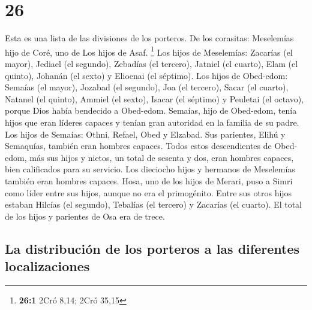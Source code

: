 \hypertarget{section-25}{%
\section{26}\label{section-25}}

 Esta es una lista de las divisiones de los porteros. De
los corasitas: Meselemías hijo de Coré, uno de Los hijos de Asaf.
\footnote{\textbf{26:1} 2Cró 8,14; 2Cró 35,15}  Los hijos
de Meselemías: Zacarías (el mayor), Jediael (el segundo), Zebadías (el
tercero), Jatniel (el cuarto),  Elam (el quinto), Johanán
(el sexto) y Elioenai (el séptimo).  Los hijos de
Obed-edom: Semaías (el mayor), Jozabad (el segundo), Joa (el tercero),
Sacar (el cuarto), Natanel (el quinto),  Ammiel (el
sexto), Isacar (el séptimo) y Peuletai (el octavo), porque Dios había
bendecido a Obed-edom.  Semaías, hijo de Obed-edom, tenía
hijos que eran líderes capaces y tenían gran autoridad en la familia de
su padre.  Los hijos de Semaías: Othni, Refael, Obed y
Elzabad. Sus parientes, Elihú y Semaquías, también eran hombres capaces.
 Todos estos descendientes de Obed-edom, más sus hijos y
nietos, un total de sesenta y dos, eran hombres capaces, bien
calificados para su servicio.  Los dieciocho hijos y
hermanos de Meselemías también eran hombres capaces. 
Hosa, uno de los hijos de Merari, puso a Simri como líder entre sus
hijos, aunque no era el primogénito.  Entre sus otros
hijos estaban Hilcías (el segundo), Tebalías (el tercero) y Zacarías (el
cuarto). El total de los hijos y parientes de Osa era de trece.

\hypertarget{la-distribuciuxf3n-de-los-porteros-a-las-diferentes-localizaciones}{%
\subsection{La distribución de los porteros a las diferentes
localizaciones}\label{la-distribuciuxf3n-de-los-porteros-a-las-diferentes-localizaciones}}


